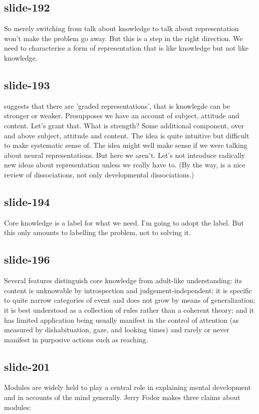 \documentclass[12pt,\papersize]{extarticle}
\begin{document}
 
\subsection{slide-192}
So merely switching from talk about knowledge to talk about representation won't make the problem go away.
But this is a step in the right direction.
We need to characterise a form of representation that is like knowledge but not like knowledge.
 
 
\subsection{slide-193}
\citet{Munakata:2001ch} suggests that there are 'graded representations', that is knowlegde can be stronger or weaker.
Presupposes we have an account of subject, attitude and content. Let's grant that.
What is strength? Some additional component, over and above subject, attitude and content.
The idea is quite intuitive but difficult to make systematic sense of.
The idea might well make sense if we were talking about neural representations.
But here we aren't. Let's not introduce radically new ideas about representation unless we really have to.
(By the way, \citet{Munakata:2001ch} is a nice review of dissociations, not only developmental dissociations.)
 
 
\subsection{slide-194}
Core knowledge is a label for what we need.
I'm going to adopt the label.
But this only amounts to labelling the problem, not to solving it.
 
 
\subsection{slide-196}
Several features distinguish core knowledge from adult-like understanding: its content is unknowable by introspection and judgement-independent; it is specific to quite narrow categories of event and does not grow by means of generalization; it is best understood as a collection of rules rather than a coherent theory; and it has limited application being usually manifest in the control of attention (as measured by dishabituation, gaze, and looking times) and rarely or never manifest in purposive actions such as reaching.
 
 
\subsection{slide-201}
Modules are widely held to play a central role in explaining mental development and in accounts of the mind generally.
Jerry Fodor makes three claims about modules:
 
\end{document}
